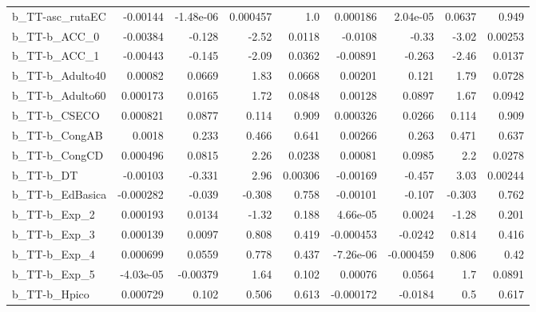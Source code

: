 \begin{tabular}{lrrrrrrrr}
b\_TT-asc\_rutaEC            &    -0.00144 &    -1.48e-06 &  0.000457 &      1.0 &   0.000186 &    2.04e-05 &       0.0637 &         0.949 \\
b\_TT-b\_ACC\_0               &    -0.00384 &       -0.128 &     -2.52 &   0.0118 &    -0.0108 &       -0.33 &        -3.02 &       0.00253 \\
b\_TT-b\_ACC\_1               &    -0.00443 &       -0.145 &     -2.09 &   0.0362 &   -0.00891 &      -0.263 &        -2.46 &        0.0137 \\
b\_TT-b\_Adulto40            &     0.00082 &       0.0669 &      1.83 &   0.0668 &    0.00201 &       0.121 &         1.79 &        0.0728 \\
b\_TT-b\_Adulto60            &    0.000173 &       0.0165 &      1.72 &   0.0848 &    0.00128 &      0.0897 &         1.67 &        0.0942 \\
b\_TT-b\_CSECO               &    0.000821 &       0.0877 &     0.114 &    0.909 &   0.000326 &      0.0266 &        0.114 &         0.909 \\
b\_TT-b\_CongAB              &      0.0018 &        0.233 &     0.466 &    0.641 &    0.00266 &       0.263 &        0.471 &         0.637 \\
b\_TT-b\_CongCD              &    0.000496 &       0.0815 &      2.26 &   0.0238 &    0.00081 &      0.0985 &          2.2 &        0.0278 \\
b\_TT-b\_DT                  &    -0.00103 &       -0.331 &      2.96 &  0.00306 &   -0.00169 &      -0.457 &         3.03 &       0.00244 \\
b\_TT-b\_EdBasica            &   -0.000282 &       -0.039 &    -0.308 &    0.758 &   -0.00101 &      -0.107 &       -0.303 &         0.762 \\
b\_TT-b\_Exp\_2               &    0.000193 &       0.0134 &     -1.32 &    0.188 &   4.66e-05 &      0.0024 &        -1.28 &         0.201 \\
b\_TT-b\_Exp\_3               &    0.000139 &       0.0097 &     0.808 &    0.419 &  -0.000453 &     -0.0242 &        0.814 &         0.416 \\
b\_TT-b\_Exp\_4               &    0.000699 &       0.0559 &     0.778 &    0.437 &  -7.26e-06 &   -0.000459 &        0.806 &          0.42 \\
b\_TT-b\_Exp\_5               &   -4.03e-05 &     -0.00379 &      1.64 &    0.102 &    0.00076 &      0.0564 &          1.7 &        0.0891 \\
b\_TT-b\_Hpico               &    0.000729 &        0.102 &     0.506 &    0.613 &  -0.000172 &     -0.0184 &          0.5 &         0.617 \\

\end{tabular}
